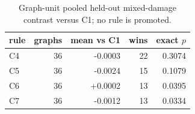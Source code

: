 \begin{table}[t]
\centering
\small
\caption{Graph-unit pooled held-out mixed-damage contrast versus C1; no rule is promoted.}
\label{tab:v2mixed}
\begin{tabular}{@{}lrrrr@{}}\toprule
rule & graphs & mean vs C1 & wins & exact $p$ \\
\midrule
C4 & 36 & -0.0003 & 22 & 0.3074 \\
C5 & 36 & -0.0024 & 15 & 0.1079 \\
C6 & 36 & +0.0002 & 13 & 0.0395 \\
C7 & 36 & -0.0012 & 13 & 0.0334 \\
\bottomrule\end{tabular}
\end{table}
